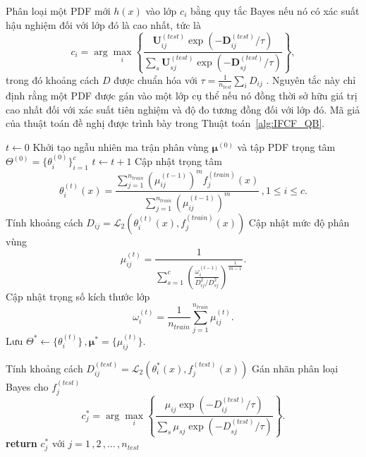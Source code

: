 \documentclass[a4paper,oneside]{book} %
\theoremstyle{plain}
\theoremstyle{plain}
\theoremstyle{nonumberplain}
\begin{document}
Phân loại một PDF mới  $h(x)$ vào lớp $c_i$ bằng quy tắc Bayes nếu nó có xác suất hậu nghiệm đối với lớp đó là cao nhất, tức là $$c_i = \arg\max_{i}\left\{\frac{\bm U^{(test)}_{ij} \exp\left (-\bm D^{(test)}_{ij}/\tau\right )}{\displaystyle\sum_s\bm U^{(test)}_{sj} \exp\left (-\bm D^{(test)}_{sj}/\tau\right )}\right\},$$ trong đó khoảng cách $D$ được chuẩn hóa với $\tau=\frac{1}{n_{test}}\sum_iD_{ij}$ . Nguyên tắc này chỉ định rằng một PDF được gán vào một lớp cụ thể nếu nó đồng thời sở hữu giá trị cao nhất đối với xác suất tiên nghiệm và độ đo tương đồng đối với lớp đó. Mã giả của thuật toán đề nghị được trình bày trong Thuật toán~\ref{alg:IFCF_QB}.


\begin{algorithm}
	\caption{Giải thuật phân loại Bayes-IFCF}
	\label{alg:IFCF_QB}
	\begin{algorithmic}[1]
		
		\State $t \gets 0$
		\State Khởi tạo ngẫu nhiên ma trận phân vùng ${\bm \mu}^{(0)}$ và tập PDF trọng tâm $\Theta^{(0)} = \{\theta_i^{(0)}\}_{i=1}^{c}$
		 
		\State $t \gets t + 1$
		\State Cập nhật trọng tâm
		$$
		\theta_i^{(t)}(x)
		=\frac{\sum_{j=1}^{n_{train}} \left(\mu_{ij}^{(t-1)}\right)^m f^{(train)}_j(x)}
		{\sum_{j=1}^{n_{train}} \left(\mu_{ij}^{(t-1)}\right)^m}\,, 1 \le i \le c.
		$$
		\State Tính khoảng cách $
		D_{ij} = \mathcal{L}_2(\theta_i^{(t)}(x), f^{(train)}_j(x))$
		\State Cập nhật mức độ phân vùng
		$$
		\mu_{ij}^{(t)} =
		\frac{1}{
			\displaystyle \sum_{s=1}^{c}
			\left(
			\frac{\omega_i^{(t-1)}}{D_{ij}^2 / D_{sj}^2}
			\right)^{\frac{1}{m-1}}
		}.
		$$
		\State Cập nhật trọng số kích thước lớp
		$$
		\omega_i^{(t)} = \frac{1}{n_{train}}\sum_{j=1}^{n_{train}} \mu_{ij}^{(t)}.
		$$
		\EndWhile
		\State Lưu $\Theta^* \gets \{\theta_i^{(t)}\}\,, \bm\mu^* = \{\mu_{ij}^{(t)}\}$.
	
		\Statex
		 
		\State Tính khoảng cách 
		$
		D_{ij}^{{(test)}} = \mathcal{L}_2\left(\theta_i^*(x), f_j^{(test)}(x)\right)
		$	
		\State Gán nhãn phân loại Bayes cho $f_j^{(test)}$
		$$
		c_j^* = \arg\max_i 
		\left\{
		\frac{
			\mu_{ij}  \exp(-D_{ij}^{{(test)}} / \tau)
		}{
			\sum_s \mu_{sj}  \exp(-D_{sj}^{{(test)}} / \tau)
		}
		\right\}.
		$$
		\EndFor
		\State \textbf{return} $c_j^*$ với $j=1\,,2\,,\ldots\,,n_{test}$
		\EndProcedure
	\end{algorithmic}
\end{algorithm}
\end{document}
